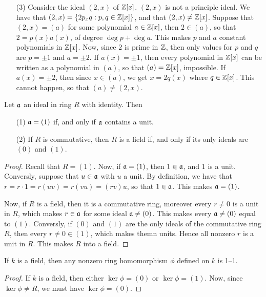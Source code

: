 \begin{example}
\begin{enumerate}
         \item[(3)] Consider the ideal $(2,x)$ of $\mathbb{Z}[x]$. $(2,x)$ is not a
             principle ideal. We have that $(2,x)=\{2p_xq : p,q \in \mathbb{Z}[x]\}$,
             and that $(2,x) \neq \mathbb{Z}[x]$. Suppose that $(2,x)=(a)$ for some
             polynomial $a \in \mathbb{Z}[x]$, then $2 \in (a)$, so that $2=p(x)a(x)$,
             of degree $\deg{p}+\deg{a}$. This makes $p$ and $a$ constant
             polynomials in $\mathbb{Z}[x]$. Now, since $2$ is prime in $\mathbb{Z}$, then only
             values for $p$ and  $q$ are  $p=\pm1$ and $a=\pm2$. If $a(x)=\pm1$,
             then every polynomial in $\mathbb{Z}[x]$ can be written as a polynomial in
             $(a)$, so that $(a)=\mathbb{Z}[x]$, impossible. If $a(x)=\pm2$, then since
             $x \in (a)$, we get $x=2q(x)$ where $q \in \mathbb{Z}[x]$. This cannot
             happen, so that $(a) \neq (2,x)$.
    \end{enumerate}
\end{example}

\begin{lemma}\label{1.4.1}
    Let $\mathfrak{a}$ an ideal in ring $R$ with identity. Then
    \begin{enumerate}
        \item[(1)] $\mathfrak{a}=(1)$ if, and only if $\mathfrak{a}$ contains a unit.

        \item[(2)] If $R$ is commutative, then $R$ is a field if, and only if
            its only ideals are $(0)$ and $(1)$.
    \end{enumerate}
\end{lemma}
\begin{proof}
    Recall that $R=(1)$. Now, if $\mathfrak{a}=(1)$, then $1 \in \mathfrak{a}$, and  $1$ is a unit.
    Conversly, suppose that $u \in \mathfrak{a}$ with $u$ a unit. By definition, we have
    that  $r=r \cdot 1=r(uv)=r(vu)=(rv)u$, so that $1 \in \mathfrak{a}$. This makes
    $\mathfrak{a}=(1)$.

    Now, if $R$ is a field, then it is a commutative ring, moreover every  $r
    \neq 0$ is a unit in $R$, which makes $r \in \mathfrak{a}$ for some ideal $\mathfrak{a} \neq
    (0)$. This makes every $\mathfrak{a} \neq (0)$ equal to $(1)$. Conversly, if $(0)$ and
    $(1)$ are the only ideals of the commutative ring $R$, then every $r \neq 0
    \in (1)$, which makes themn units. Hence all nonzero $r$ is a unit in $R$.
    This makes $R$ into a field.
\end{proof}
\begin{corollary}
    If $k$ is a field, then any nonzero ring homomorphism $\phi$ defined on $k$
    is 1--1.
\end{corollary}
\begin{proof}
    If $k$ is a field, then either $\ker{\phi}=(0)$ or $\ker{\phi}=(1)$. Now,
    since $\ker{\phi} \neq R$, we must have $\ker{\phi}=(0)$.
\end{proof}

